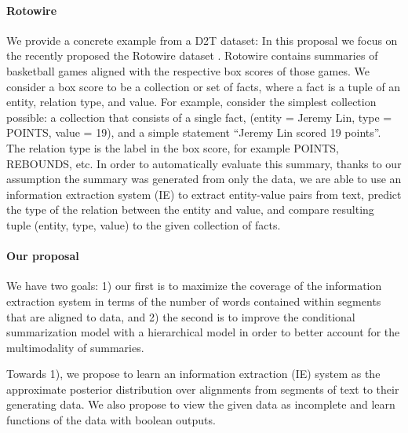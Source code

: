\documentclass[11pt]{article}
\begin{document}


\paragraph{Rotowire}
We provide a concrete example from a D2T dataset:
In this proposal we focus on the recently proposed
the Rotowire dataset \citep{wiseman2017d2t}.
Rotowire contains summaries of basketball games aligned with the respective
box scores of those games.
We consider a box score to be a collection or set of facts,
where a fact is a tuple of an entity, relation type, and value.
For example, consider the simplest collection possible:
a collection that consists of a single fact, (entity = Jeremy Lin, type = POINTS, value = 19),
and a simple statement ``Jeremy Lin scored 19 points''.
The relation type is the label in the box score, for example POINTS, REBOUNDS, etc.
In order to automatically evaluate this summary,
thanks to our assumption the summary was generated from only the data,
we are able to use an information extraction system (IE) to extract entity-value pairs
from text,
predict the type of the relation between the entity and value,
and compare resulting tuple (entity, type, value) to the given collection of facts.

\paragraph{Our proposal}
We have two goals: 1) our first is to maximize the coverage of the information extraction system
in terms of the number of words contained within segments that are aligned to data,
and 2) the second is to improve the conditional summarization model with a hierarchical model
in order to better account for the multimodality of summaries.

Towards 1), we propose to learn an information extraction (IE) system as the approximate posterior distribution over 
alignments from segments of text to their generating data.
We also propose to view the given data as incomplete and learn functions of the data
with boolean outputs.
\end{document}
